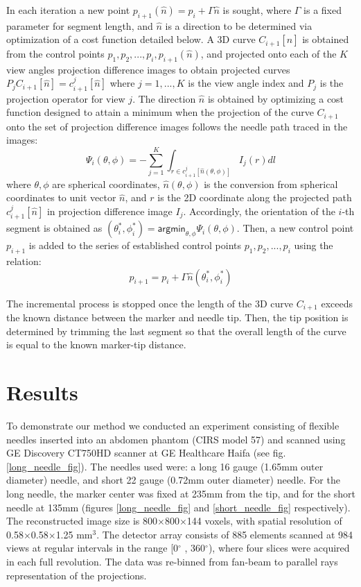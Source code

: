 \documentclass[letterpaper, 11 pt, conference]{ieeeconf}  %
\begin{document}
In each iteration a new point $p_{i+1}(\hat{n}) = p_i + \Gamma \hat{n}$ is sought, where $\Gamma$ is a fixed parameter for segment length, and $\hat{n}$ is a direction to be determined via optimization of a cost function detailed below.
A 3D curve $C_{i+1}[\hat{n}]$ is obtained from the control points $p_1, p_2, ..., p_i, p_{i+1}(\hat{n})$, and projected onto each of the $K$ view angles projection difference images to obtain projected curves $P_j C_{i+1}[\hat{n}] = c_{i+1}^j[\hat{n}]$ where $j=1,...,K$ is the view angle index and $P_j$ is the projection operator for view $j$.
The direction $\hat{n}$ is obtained by optimizing a cost function designed to attain a minimum when the projection of the curve $C_{i+1}$ onto the set of projection difference images follows the needle path traced in the images:
\[ \Psi_i(\theta, \phi) = -\sum_{j=1}^K{\int_{r \in c_{i+1}^j[\hat{n}(\theta, \phi)]} {I_j(r)dl}} \]
where $ \theta, \phi$ are spherical coordinates, $ \hat{n}(\theta, \phi) $ is the conversion from spherical coordinates to unit vector $ \hat{n} $, and $r$ is the 2D coordinate along the projected path $c_{i+1}^j[\hat{n}]$ in projection difference image $I_j$. 
Accordingly, the orientation of the $i$-th segment is obtained as $(\theta_i^*, \phi_i^*) = \textsf{argmin}_{\theta, \phi} \Psi_i ( \theta, \phi)$. Then, a new control point $p_{i+1}$ is added to the series of established control points $p_1, p_2, ..., p_i$ using the relation:
$$ p_{i+1} = p_i + \Gamma \hat{n}(\theta_i^*, \phi_i^*) $$

The incremental process is stopped once the length of the 3D curve $C_{i+1}$ exceeds the known distance between the marker and needle tip. Then, the tip position is determined by trimming the last segment so that the overall length of the curve is equal to the known marker-tip distance.

\section{Results}

To demonstrate our method we conducted an experiment consisting of flexible needles inserted into an abdomen phantom (CIRS model 57) and scanned using GE Discovery CT750HD scanner at GE Healthcare Haifa (see fig. \ref{long_needle_fig}). The needles used were: a long 16 gauge (1.65mm outer diameter) needle, and short 22 gauge (0.72mm outer diameter) needle. For the long needle, the marker center was fixed at 235mm from the tip, and for the short needle at 135mm (figures \ref{long_needle_fig} and \ref{short_needle_fig} respectively).
The reconstructed image size is 800$\times$800$\times$144 voxels, with spatial resolution of 0.58$\times$0.58$\times$1.25 mm$^3$. The detector array consists of 885 elements scanned at 984 views at regular intervals in the range [0$^{\circ}$ , 360$^{\circ}$), where four slices were acquired in each full revolution. The data was re-binned from fan-beam to parallel rays representation of the projections.
\end{document}

